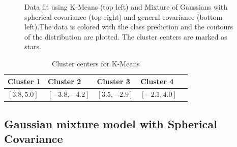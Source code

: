 \documentclass[paper=a4, fontsize=11pt]{scrartcl} %
\numberwithin{equation}{section} %
\numberwithin{figure}{section} %
\numberwithin{table}{section} %
\begin{document}
\begin{figure}
\begin{subfigure}{.5\textwidth}
	\end{subfigure}
	\caption{Data fit using K-Means (top left) and Mixture of Gaussians with spherical covariance (top right) and general covariance (bottom left).The data is colored with the class prediction and the contours of the distribution are plotted. The cluster centers are marked as stars.}
\end{figure}

	\begin{table}
		\caption {Cluster centers for K-Means} \label{tab:title} 
		\begin{center}		
			\begin{tabular}{*5l}   
				\toprule
				Cluster 1 & Cluster 2 & Cluster 3 & Cluster 4
				\\\midrule
				$[3.8, 5.0]$ & $[-3.8, -4.2]$ & $[3.5,-2.9]$ & $[-2.1, 4.0]$ \\\bottomrule
				\hline
			\end{tabular}
		\end{center}
	\end{table}
	
	
\subsection{Gaussian mixture model with Spherical Covariance}
\end{document}

